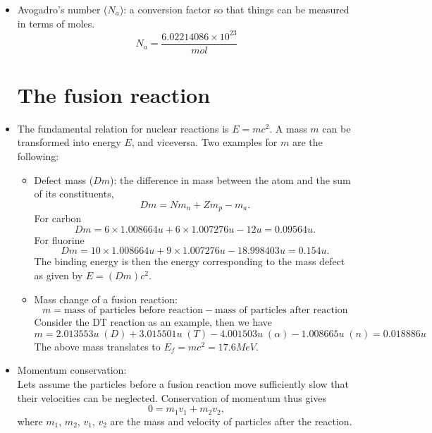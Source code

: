 \documentclass[oneside,a4paper,11pt]{report}
\begin{document}
\begin{itemize}
\item Avogadro's number ($N_a$): a conversion factor so that things can be measured in terms of moles. 
\begin{equation}
    N_a = \frac{6.02214086 \times 10^{23}}{mol} 
\end{equation}

\section{The fusion reaction}
\item The fundamental relation for nuclear reactions is $E = m c^2$. A mass $m$ can be transformed into energy $E$, and viceversa. Two examples for $m$ are the following:
\begin{itemize}
\item Defect mass ($Dm$): the difference in mass between the atom and the sum of its constituents,
\begin{equation}
Dm = N m_n + Z m_p - m_a.
\end{equation}
For carbon
\begin{equation}
Dm = 6 \times 1.008664 u + 6 \times 1.007276 u - 12u = 0.09564 u.
\end{equation}
For fluorine
\begin{equation}
Dm = 10 \times 1.008664 u + 9 \times 1.007276 u - 18.998403u = 0.154 u.
\end{equation}
The binding energy is then the energy corresponding to the mass defect as given by  $E = (Dm)c^2$.

\item Mass change of a fusion reaction:
\begin{equation}
m = \text{mass of particles before reaction} - \text{mass of particles after reaction} 
\end{equation}
Consider the DT reaction as an example, then we have
\begin{equation}
m = 2.013553u \;(D) + 3.015501u \;(T) - 4.001503u \;(\alpha) - 1.008665u \;(n) = 0.018886u
\end{equation}
The above mass translates to $E_f = mc^2 = 17.6MeV$.
\end{itemize}

\item Momentum conservation:\\
Lets assume the particles before a fusion reaction move sufficiently slow that their velocities can be neglected. Conservation of momentum thus gives
\begin{equation}
0 = m_1 v_1 + m_2 v_2,
\end{equation}
where $m_1$, $m_2$, $v_1$, $v_2$ are the mass and velocity of particles after the reaction.


\end{itemize}
\end{document}
